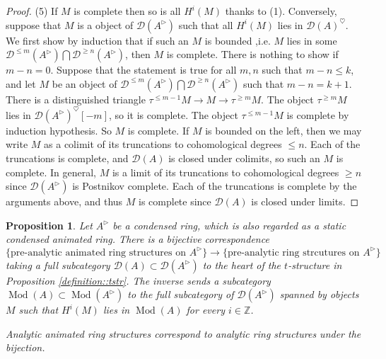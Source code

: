 \documentclass{article}
\theoremstyle{plain}
\newtheorem{prop}[thm]{Proposition}
\theoremstyle{definition}
\theoremstyle{remark}
\DeclareMathOperator{\modcat}{Mod}
\newcommand{\huflag}{\triangleright}
\newcommand{\D}{\mathcal{D}}
\newcommand{\heart}{\heartsuit}
\begin{document}
\begin{proof}
(5)
If $ M $ is complete then so is all $ H ^{i}(M) $ thanks to (1).
Conversely, suppose that $ M $ is a object of $ \D (A ^{\huflag}) $ such that all $ H ^{i}(M) $ lies in $ \D (A)^{\heart} $.
We first show by induction that
if such an $ M $ is bounded ,i.e. $ M $ lies in some $ \D ^{\leq m}(A ^{\huflag}) \bigcap \D ^{\geq n}(A ^{\huflag}) $,
then $ M $ is complete.
There is nothing to show if $ m-n=0 $. Suppose that the statement is true for all $ m,n $ such that $ m-n\leq k $,
and let $ M $ be an object of $ \D ^{\leq m}(A ^{\huflag}) \bigcap \D ^{\geq n}(A ^{\huflag}) $ such that $ m-n=k+1 $.
There is a distinguished triangle $ \tau ^{\leq m-1} M \to M \to \tau ^{\geq m} M $.
The object $ \tau ^{\geq m}M $ lies in $ \D (A ^{\huflag})^{\heart}[-m] $, so it is complete.
The object $ \tau ^{\leq m-1} M $ is complete by induction hypothesis.
So $ M $ is complete.
If $ M $ is bounded on the left, then we may write $ M $ as a colimit of its truncations to cohomological degrees $ \leq n $.
Each of the truncations is complete, and $ \D (A) $ is closed under colimits, so such an $ M $ is complete.
In general, $ M $ is a limit of its truncations to cohomological degrees $ \geq n $ since $ \D (A ^{\huflag}) $
is Postnikov complete.
Each of the truncations is complete by the arguments above, and thus $ M $ is complete since $ \D (A) $ is closed under limits.
\end{proof}

\begin{prop}
Let $ A ^{\huflag} $ be a condensed ring, which is also regarded as a static condensed animated ring.
There is a bijective correspondence
$$ \{\text{pre-analytic animated ring structures on } A ^{\huflag}\} \to \{\text{pre-analytic ring strcutures on } A ^{\huflag}\} $$
taking a full subcategory $ \D (A)\subset \D (A ^{\huflag}) $ to the heart of the $ t $-structure in Proposition \ref{definition::tstr}.
The inverse sends a subcategory $ \modcat (A)\subset \modcat (A ^{\huflag}) $ to the full subcategory of $ \D (A ^{\huflag}) $ spanned by
objects $ M $ such that $ H ^{i}(M) $ lies in $ \modcat (A) $ for every $ i\in \mathbb{Z} $.

Analytic animated ring structures correspond to analytic ring structures under the bijection.
\label{definition::comparison}
\end{prop}
\end{document}
